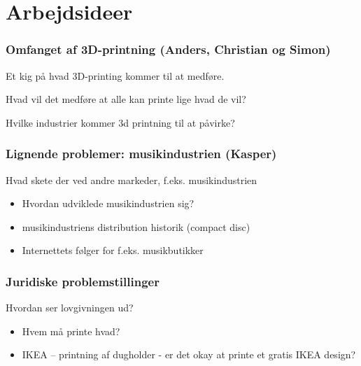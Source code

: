 \chapter{Arbejdsideer} %
\label{cha:arbejdsideer}

\subsection{Omfanget af 3D-printning (Anders, Christian og Simon)} %
\label{sub:omfanget_af_3d_printning_anders_christian_og_simon_}

Et kig på hvad 3D-printing kommer til at medføre.

Hvad vil det medføre at alle kan printe lige hvad de vil?

Hvilke industrier kommer 3d printning til at påvirke?




\subsection{Lignende problemer: musikindustrien (Kasper)} %
\label{sub:lignende_problemer_musikindustrien_kasper_}

Hvad skete der ved andre markeder, f.eks. musikindustrien

\begin{itemize}
	\item Hvordan udviklede musikindustrien sig?
	\item musikindustriens distribution historik (compact disc)
	\item Internettets følger for f.eks. musikbutikker
\end{itemize}

\subsection{Juridiske problemstillinger} %
\label{sub:juridiske_problemstillinger}

Hvordan ser lovgivningen ud?

\begin{itemize}
	\item Hvem må printe hvad?
	\item IKEA – printning af dugholder - er det okay at printe et gratis IKEA design?
\end{itemize}


